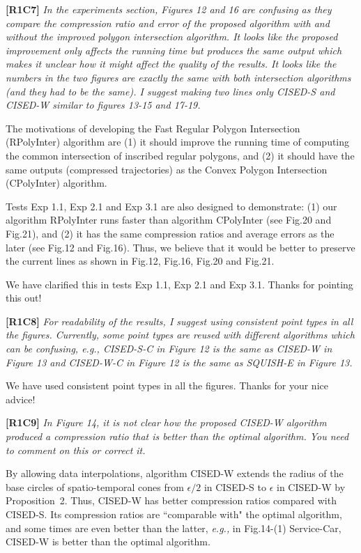 \documentclass{letter}
\newcommand{\eg}{\emph{e.g.,}\xspace}
\begin{document}
{\textbf{[R1C7]} \emph{In the experiments section, Figures 12 and 16 are confusing as they compare the compression ratio and error of the proposed algorithm with and without the improved polygon intersection algorithm. It looks like the proposed improvement only affects the running time but produces the same output which makes it unclear how it might affect the quality of the results. It looks like the numbers in the two figures are exactly the same with both intersection algorithms (and they had to be the same). I suggest making two lines only CISED-S and CISED-W similar to figures 13-15 and 17-19.}

The motivations of developing the Fast Regular Polygon Intersection (RPolyInter) algorithm are (1) it should improve the running time of computing the common intersection of inscribed regular polygons, and (2) it should have the same outputs (compressed trajectories) as the Convex Polygon Intersection (CPolyInter) algorithm.

Tests Exp 1.1, Exp 2.1 and Exp 3.1 are also designed to demonstrate: (1) our algorithm RPolyInter runs faster than algorithm CPolyInter (see Fig.20 and Fig.21), and (2) it has the same compression ratios and average errors as the later (see Fig.12 and Fig.16).
%
Thus, we believe that it would be better to preserve the current lines as shown in Fig.12, Fig.16, Fig.20 and Fig.21. %

We have clarified this in tests Exp 1.1, Exp 2.1 and Exp 3.1. Thanks for pointing this out!

\textbf{[R1C8]} \emph{For readability of the results, I suggest using consistent point types in all the figures. Currently, some point types are reused with different algorithms which can be confusing, e.g., CISED-S-C in Figure 12 is the same as CISED-W in Figure 13 and CISED-W-C in Figure 12 is the same as SQUISH-E in Figure 13.}

We have used consistent point types in all the figures. Thanks for your nice advice!

\textbf{[R1C9]} \emph{In Figure 14, it is not clear how the proposed CISED-W algorithm produced a compression ratio that is better than the optimal algorithm. You need to comment on this or correct it.}

By allowing data interpolations, algorithm CISED-W extends the radius of the base circles of spatio-temporal cones from $\epsilon/2$ in CISED-S to $\epsilon$ in CISED-W by Proposition~2. Thus, CISED-W has better compression ratios compared with CISED-S. Its compression ratios are ``comparable with" the optimal algorithm, and some times are even better than the latter, \eg in Fig.14-(1) Service-Car, CISED-W is better than the optimal algorithm.


}
\end{document}
